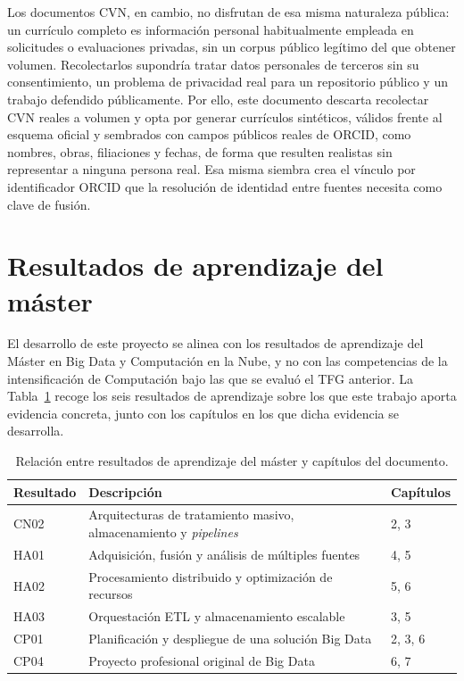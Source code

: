 Los documentos CVN, en cambio, no disfrutan de esa misma naturaleza
pública: un currículo completo es información personal habitualmente
empleada en solicitudes o evaluaciones privadas, sin un corpus público
legítimo del que obtener volumen. Recolectarlos supondría tratar datos
personales de terceros sin su consentimiento, un problema de privacidad
real para un repositorio público y un trabajo defendido públicamente. Por
ello, este documento descarta recolectar CVN reales a volumen y opta por
generar currículos sintéticos, válidos frente al esquema oficial y
sembrados con campos públicos reales de ORCID, como nombres, obras,
filiaciones y fechas, de forma que resulten realistas sin representar a
ninguna persona real. Esa misma siembra crea el vínculo por identificador
ORCID que la resolución de identidad entre fuentes necesita como clave de
fusión.

\section{Resultados de aprendizaje del máster}
\label{sec:introduccion_outcomes}

El desarrollo de este proyecto se alinea con los resultados de aprendizaje
del Máster en Big Data y Computación en la Nube, y no con las
competencias de la intensificación de Computación bajo las que se evaluó
el TFG anterior. La Tabla~\ref{tab:tfm_learning_outcomes} recoge los seis
resultados de aprendizaje sobre los que este trabajo aporta evidencia
concreta, junto con los capítulos en los que dicha evidencia se desarrolla.

\begin{table}[htbp]
  \centering
  \renewcommand{\arraystretch}{1.2}
  \begin{tabular}{p{} p{} p{}}
    \hline
    \textbf{Resultado} & \textbf{Descripción} & \textbf{Capítulos} \\
    \hline
    CN02 & Arquitecturas de tratamiento masivo, almacenamiento y \textit{pipelines} & 2, 3 \\
    HA01 & Adquisición, fusión y análisis de múltiples fuentes & 4, 5 \\
    HA02 & Procesamiento distribuido y optimización de recursos & 5, 6 \\
    HA03 & Orquestación ETL y almacenamiento escalable & 3, 5 \\
    CP01 & Planificación y despliegue de una solución Big Data & 2, 3, 6 \\
    CP04 & Proyecto profesional original de Big Data & 6, 7 \\
    \hline
  \end{tabular}
  \caption{Relación entre resultados de aprendizaje del máster y capítulos del documento.}
  \label{tab:tfm_learning_outcomes}
\end{table}

